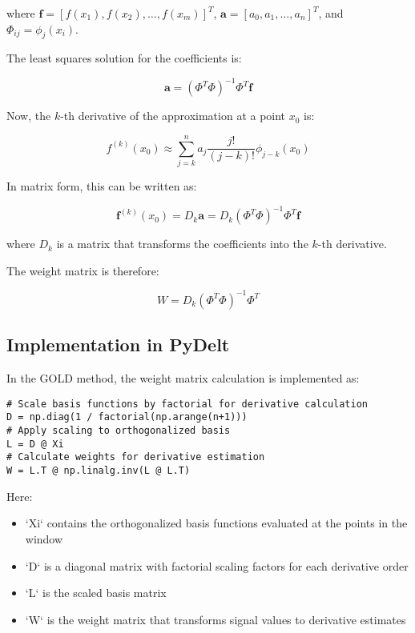 \documentclass{article}
\begin{document}
where $\mathbf{f} = [f(x_1), f(x_2), \ldots, f(x_m)]^T$, $\mathbf{a} = [a_0, a_1, \ldots, a_n]^T$, and $\Phi_{ij} = \phi_j(x_i)$.

The least squares solution for the coefficients is:

\begin{equation}
\mathbf{a} = (\Phi^T \Phi)^{-1} \Phi^T \mathbf{f}
\end{equation}

Now, the $k$-th derivative of the approximation at a point $x_0$ is:

\begin{equation}
f^{(k)}(x_0) \approx \sum_{j=k}^n a_j \frac{j!}{(j-k)!} \phi_{j-k}(x_0)
\end{equation}

In matrix form, this can be written as:

\begin{equation}
\mathbf{f}^{(k)}(x_0) = D_k \mathbf{a} = D_k (\Phi^T \Phi)^{-1} \Phi^T \mathbf{f}
\end{equation}

where $D_k$ is a matrix that transforms the coefficients into the $k$-th derivative.

The weight matrix is therefore:

\begin{equation}
W = D_k (\Phi^T \Phi)^{-1} \Phi^T
\end{equation}

\subsection{Implementation in PyDelt}

In the GOLD method, the weight matrix calculation is implemented as:

\begin{verbatim}
# Scale basis functions by factorial for derivative calculation
D = np.diag(1 / factorial(np.arange(n+1)))
# Apply scaling to orthogonalized basis
L = D @ Xi
# Calculate weights for derivative estimation
W = L.T @ np.linalg.inv(L @ L.T)
\end{verbatim}

Here:
\begin{itemize}
    \item `Xi` contains the orthogonalized basis functions evaluated at the points in the window
    \item `D` is a diagonal matrix with factorial scaling factors for each derivative order
    \item `L` is the scaled basis matrix
    \item `W` is the weight matrix that transforms signal values to derivative estimates
\end{itemize}
\end{document}
